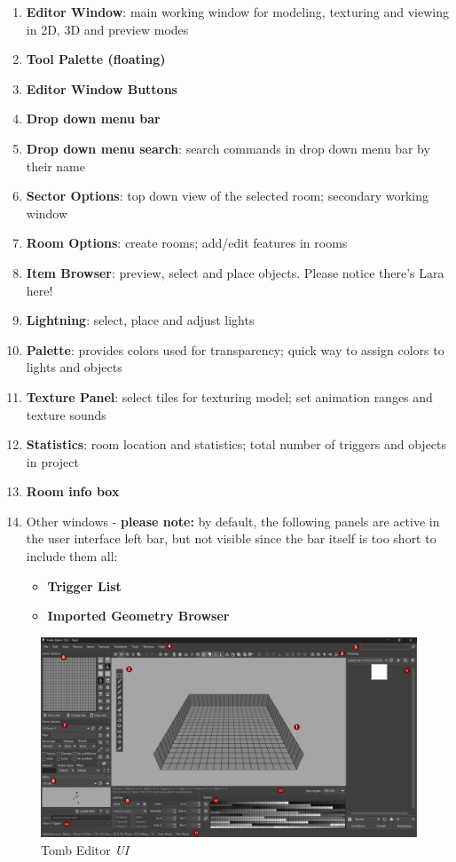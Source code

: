 \begin{enumerate}
    \item \textbf{Editor Window}: main working window for modeling, texturing and viewing in 2D, 3D and preview modes
    \item \textbf{Tool Palette (floating)}
    \item \textbf{Editor Window Buttons}
    \item \textbf{Drop down menu bar}
    \item \textbf{Drop down menu search}: search commands in drop down menu bar by their name
    \item \textbf{Sector Options}: top down view of the selected room; secondary working window
    \item \textbf{Room Options}: create rooms; add/edit features in rooms
    \item \textbf{Item Browser}: preview, select and place objects. Please notice there's Lara here!
    \item \textbf{Lightning}: select, place and adjust lights
    \item \textbf{Palette}: provides colors used for transparency; quick way to assign colors to lights and objects
    \item \textbf{Texture Panel}: select tiles for texturing model; set animation ranges and texture sounds
    \item \textbf{Statistics}: room location and statistics; total number of triggers and objects in project
    \item \textbf{Room info box}
    \item Other windows - \textbf{please note:} by default, the following panels are active in the user interface left bar, but not visible since the bar itself is too short to include them all: %
\begin{itemize}
    \item \textbf{Trigger List}
    \item \textbf{Imported Geometry Browser}
\end{itemize}

\end{enumerate}

\begin{figure}
    \centering
     \includegraphics[width=1\textwidth]{screenshots/1002.png}
     \caption{Tomb Editor \emph{UI}}
     \label{fig:TEUI} 
\end{figure}

